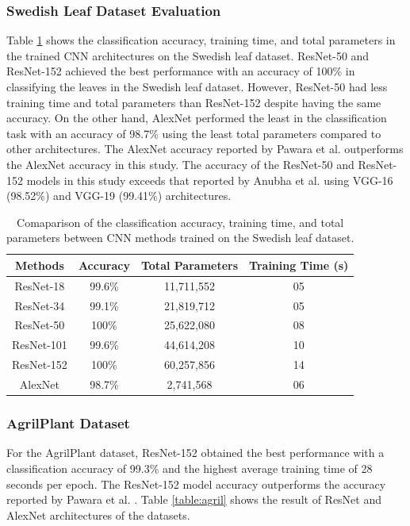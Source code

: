\documentclass[conference]{IEEEtran}
\begin{document}
\subsubsection{Swedish Leaf Dataset Evaluation} 
Table \ref{tab1} shows the classification accuracy, training time, and total parameters in the trained CNN architectures on the Swedish leaf dataset. ResNet-50 and ResNet-152 achieved the best performance with an accuracy of 100\% in classifying the leaves in the Swedish leaf dataset. However, ResNet-50 had less training time and total parameters than ResNet-152 despite having the same accuracy. On the other hand, AlexNet performed the least in the classification task with an accuracy of 98.7\% using the least total parameters compared to other architectures. The AlexNet accuracy reported by Pawara et al. \cite{pawara2017data} outperforms the AlexNet accuracy in this study. The accuracy of the ResNet-50 and ResNet-152 models in this study exceeds that reported by Anubha et al. \cite{anubha2019study} using VGG-16 (98.52\%) and VGG-19 (99.41\%) architectures.
\begin{table}[htbp]
\caption{Comaparison of the classification accuracy, training time, and total parameters between CNN methods trained on the Swedish leaf dataset.}
\begin{center}
\begin{tabular}{c|c|c|c}

\textbf{Methods} & \textbf{Accuracy}& \textbf{Total Parameters}& \textbf{Training Time (s)} \\
\hline
\hline
ResNet-18 & 99.6\%& 11,711,552 & 05 \\
\hline
ResNet-34 & 99.1\%& 21,819,712 & 05 \\
\hline
ResNet-50 & 100\%& 25,622,080 & 08 \\
\hline
ResNet-101 & 99.6\%& 44,614,208 & 10 \\
\hline
ResNet-152 & 100\%& 60,257,856 & 14 \\
\hline
AlexNet & 98.7\%& 2,741,568 & 06 \\

\end{tabular}
\label{tab1}
\end{center}
\end{table}

\subsubsection{AgrilPlant Dataset}
For the AgrilPlant dataset, ResNet-152 obtained the best performance with a classification accuracy of 99.3\% and the highest average training time of 28 seconds per epoch. The ResNet-152 model accuracy outperforms the accuracy reported by Pawara et al. \cite{pawara2017comparing}. Table \ref{table:agril} shows the result of ResNet and AlexNet architectures of the datasets. 
\end{document}
